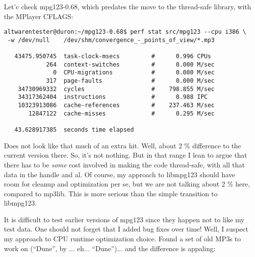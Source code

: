\documentclass[a4paper,12pt]{scrartcl}
\begin{document}
Let'c check mpg123-0.68, which predates the move to the thread-safe library, with the MPlayer CFLAGS:
\begin{verbatim}
altwarentester@duron:~/mpg123-0.68$ perf stat src/mpg123 --cpu i386 \
 -w /dev/null    /dev/shm/convergence_-_points_of_view/*.mp3

   43475.950745  task-clock-msecs         #      0.996 CPUs 
            264  context-switches         #      0.000 M/sec
              0  CPU-migrations           #      0.000 M/sec
            317  page-faults              #      0.000 M/sec
    34730969332  cycles                   #    798.855 M/sec
    34317362404  instructions             #      0.988 IPC  
    10323913086  cache-references         #    237.463 M/sec
       12847122  cache-misses             #      0.295 M/sec

   43.628917385  seconds time elapsed
\end{verbatim}
Does not look like that much of an extra hit. Well, about 2 \% difference to the current version there. So, it's not nothing.
But in that range I lean to argue that there has to be {\em some} cost involved in making the code thread-safe, with all that data in the handle and al.
Of course, my approach to libmpg123 should have room for cleanup and optimization per se, but we are not talking about 2 \% here, compared to mp3lib. This is more serious than the simple transition to libmpg123.

It is difficult to test earlier versions of mpg123 since they happen not to like my test data. One should not forget that I added bug fixes over time! Well, I suspect my approach to CPU runtime optimization choice.
Found a set of old MP3s to work on (``Dune'', by ... eh... ``Dune'')... and the difference is appaling:
\end{document}
